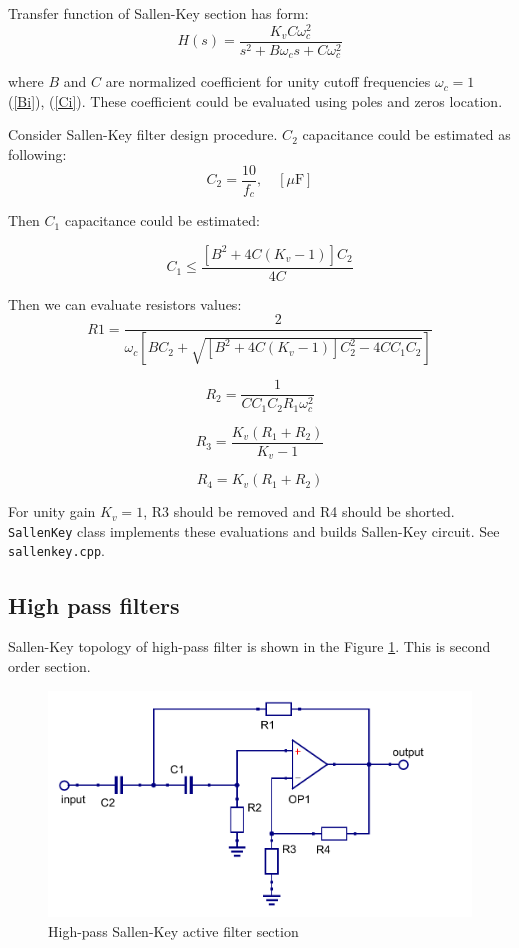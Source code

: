 Transfer function of Sallen-Key section has form:
\begin{equation}
 H(s)=\frac{K_v C\omega_c^2}{s^2+B\omega_cs+C\omega_c^2} \label{sk-lpf-trfunc}
\end{equation}

where $B$ and $C$ are normalized coefficient for unity cutoff frequencies
$\omega_c=1$ (\ref{Bi}), (\ref{Ci}). These coefficient could be evaluated using
poles and zeros location.

Consider Sallen-Key filter design procedure. $C_2$ capacitance could be
estimated as following:
\begin{equation}
 C_2=\frac{10}{f_c},  \quad [\mu\mbox{F}] \label{lp-C2}
\end{equation}

Then $C_1$ capacitance could be estimated:

\begin{equation}
 C_1\leq \frac{[B^2+4C(K_v-1)]C_2}{4C}
\end{equation}

Then we can evaluate resistors values:
\begin{equation}
 R1 = \frac{2}{\omega_c[BC_2+\sqrt{[B^2+4C(K_v-1)]C^2_2-4CC_1C_2}]}
\end{equation}

\begin{equation}
 R_2=\frac{1}{CC_1C_2R_1\omega_c^2}
\end{equation}

\begin{equation}
 R_3=\frac{K_v(R_1+R_2)}{K_v-1}
\end{equation}

\begin{equation}
 R_4=K_v(R_1+R_2)
\end{equation}

For unity gain $K_v=1$, R3 should be removed and R4 should be shorted.
\verb|SallenKey| class implements these evaluations and builds Sallen-Key
circuit. See \verb|sallenkey.cpp|.


\subsection{High pass filters}

Sallen-Key topology of high-pass filter is shown in the Figure
\ref{fig:sk-hpf}. This is second order section.

\begin{figure}[!ht]
  \centering
  \includegraphics[width=0.6\linewidth]{pics/sk-hpf}
  \caption{High-pass Sallen-Key active filter section}
  \label{fig:sk-hpf}
\end{figure}

